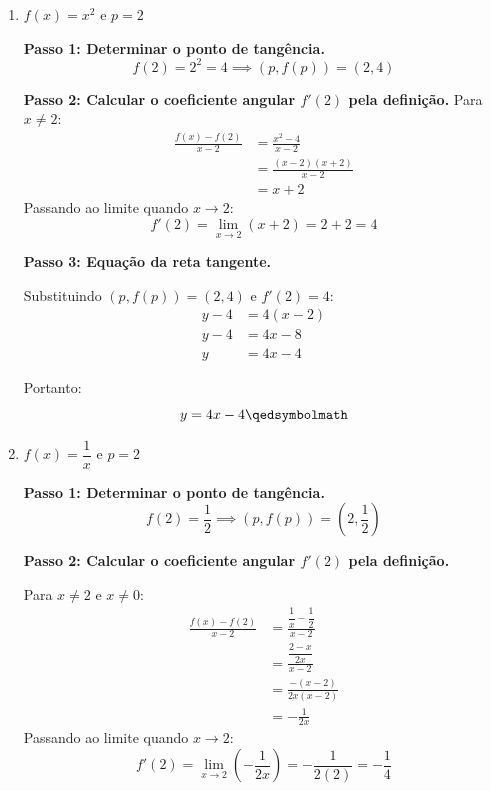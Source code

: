 \vspace{0.4cm}
\begin{enumerate}[label=\alph*)]
    \item $f(x) = x^2$ e $p = 2$
    
    \textbf{Passo 1: Determinar o ponto de tangência.}
    \[
    f(2) = 2^2 = 4 \implies (p, f(p)) = (2, 4)
    \]

    \textbf{Passo 2: Calcular o coeficiente angular $f'(2)$ pela definição.}
    Para $x \neq 2$:
    \begin{align*}
        \frac{f(x) - f(2)}{x - 2} &= \frac{x^2 - 4}{x - 2} \\[0.25cm]
        &= \frac{(x - 2)(x + 2)}{x - 2} \\[0.25cm]
        &= x + 2
    \end{align*}
    Passando ao limite quando $x \to 2$:
    \[
    f'(2) = \lim_{x \to 2} (x + 2) = 2 + 2 = 4
    \]

    \textbf{Passo 3: Equação da reta tangente.}

    Substituindo $(p, f(p)) = (2, 4)$ e $f'(2) = 4$:
    \begin{align*}
        y - 4 &= 4(x - 2) \\[0.25cm]
        y - 4 &= 4x - 8 \\[0.25cm]
        y &= 4x - 4
    \end{align*}

    Portanto:
    \[
    y = 4x - 4 \qedsymbolmath
    \]

    \item $f(x) = \dfrac{1}{x}$ e $p = 2$
    
    \textbf{Passo 1: Determinar o ponto de tangência.}
    \[
    f(2) = \frac{1}{2} \implies (p, f(p)) = \left(2, \frac{1}{2}\right)
    \]

    \textbf{Passo 2: Calcular o coeficiente angular $f'(2)$ pela definição.}

    Para $x \neq 2$ e $x \neq 0$:
    \begin{align*}
        \frac{f(x) - f(2)}{x - 2} &= \frac{\dfrac{1}{x} - \dfrac{1}{2}}{x - 2} \\[0.25cm]
        &= \frac{\dfrac{2 - x}{2x}}{x - 2} \\[0.25cm]
        &= \frac{-(x - 2)}{2x(x - 2)} \\[0.25cm]
        &= -\frac{1}{2x}
    \end{align*}
    Passando ao limite quando $x \to 2$:
    \[
    f'(2) = \lim_{x \to 2} \left(-\frac{1}{2x}\right) = -\frac{1}{2(2)} = -\frac{1}{4}
    \]


\end{enumerate}
